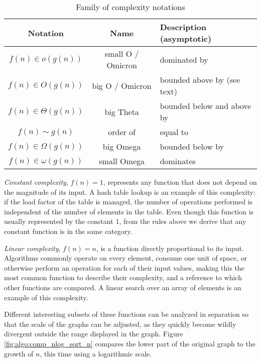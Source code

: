 \begin{table}[ht]
    \centering
    \begin{tabular}{ccl}
        Notation & Name & Description (asymptotic) \\
        \hline
        $f(n) \in o(g(n))$ & small O / Omicron & dominated by \\
        $f(n) \in O(g(n))$ & big O / Omicron & bounded above by (see text) \\
        $f(n) \in \Theta(g(n))$ & big Theta & bounded below and above by \\
        $f(n) \sim g(n)$ & order of & equal to \\
        $f(n) \in \Omega(g(n))$ & big Omega & bounded below by \\
        $f(n) \in \omega(g(n))$ & small Omega & dominates \\
    \end{tabular}
    \caption{Family of complexity notations}
    \label{tbl:algo:big_o}
\end{table}

\textit{Constant complexity}, $f(n) = 1$, represents any function that does not
depend on the magnitude of its input.  A hash table lookup is an example of this
complexity: if the load factor of the table is managed, the number of operations
performed is independent of the number of elements in the table.  Even though
this function is usually represented by the constant $1$, from the rules above
we derive that any constant function is in the same category.

\textit{Linear complexity}, $f(n) = n$, is a function directly proportional to
its input.  Algorithms commonly operate on every element, consume one unit of
space, or otherwise perform an operation for each of their input values, making
this the most common function to describe their complexity, and a reference to
which other functions are compared.  A linear search over an array of elements
is an example of this complexity.

Different interesting subsets of these functions can be analyzed in separation
so that the scale of the graphs can be adjusted, as they quickly become wildly
divergent outside the range displayed in the graph.  Figure
\ref{fig:algo:comp_nlog_sqrt_n} compares the lower part of the original graph to
the growth of $n$, this time using a logarithmic scale.

